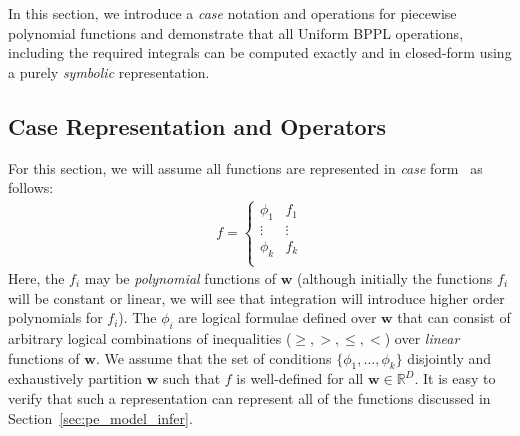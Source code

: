 \documentclass[letterpaper]{article}
\newcommand{\R}{\mathbb{R}}
\renewcommand{\vec}[1]{\mathbf{#1}}
\begin{document}
In this section, we introduce a \emph{case} notation and operations
for piecewise polynomial functions and demonstrate that all Uniform
BPPL operations, including the required integrals can be computed
exactly and in closed-form using a purely \emph{symbolic}
representation.

\subsection{Case Representation and Operators}

For this section, we will assume all functions
are represented in \emph{case} form~\cite{uai11} as follows:
{%
\begin{align}
f = 
\begin{cases}
  \phi_1 & f_1 \\ 
  \vdots & \vdots \\ 
  \phi_k & f_k \\ 
\end{cases} 
\label{eq:case}
\end{align}
} Here, the $f_i$ may be \emph{polynomial} functions of $\vec{w}$ (although
initially the functions $f_i$ will be constant or linear, we will see
that integration will introduce higher order polynomials for $f_i$).  The
$\phi_i$ are logical formulae defined over $\vec{w}$ that can consist
of arbitrary logical combinations of inequalities ($\geq,>,\leq,<$)
over \emph{linear} functions of $\vec{w}$.  We assume that the set of
conditions $\{ \phi_1,\ldots,\phi_k \}$ disjointly and exhaustively
partition $\vec{w}$ such that $f$ is well-defined for all $\vec{w} \in
\R^D$.  It is easy to verify that such a representation can represent
all of the functions discussed in Section~\ref{sec:pe_model_infer}.
\end{document}
